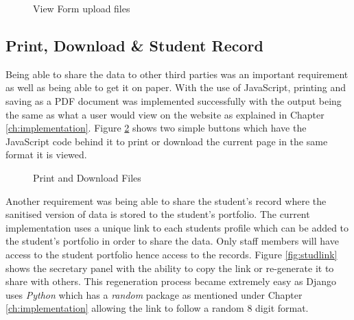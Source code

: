 \documentclass[../main.tex]{subfiles}
\begin{document}
\begin{figure}[H]
        \caption{\label{fig:viewformmorefiles} View Form upload files}
      \end{figure}
      
\subsection*{Print, Download \& Student Record}
Being able to share the data to other third parties was an important requirement as well as being able to get it on paper. With the use of JavaScript, printing and saving as a PDF document was implemented successfully with the output being the same as what a user would view on the website as explained in Chapter \ref{ch:implementation}. Figure \ref{fig:print} shows two simple buttons which have the JavaScript code behind it to print or download the current page in the same format it is viewed. 

\begin{figure}[H]
        \caption{\label{fig:print} Print and Download Files}
      \end{figure}
      
Another requirement was being able to share the student's record where the sanitised version of data is stored to the student's portfolio. The current implementation uses a unique link to each students profile which can be added to the student's portfolio in order to share the data. Only staff members will have access to the student portfolio hence access to the records. Figure \ref{fig:studlink} shows the secretary panel with the ability to copy the link or re-generate it to share with others. This regeneration process became extremely easy as Django uses \textit{Python} which has a \textit{random} package as mentioned under Chapter \ref{ch:implementation} allowing the link to follow a random 8 digit format.
\end{document}
